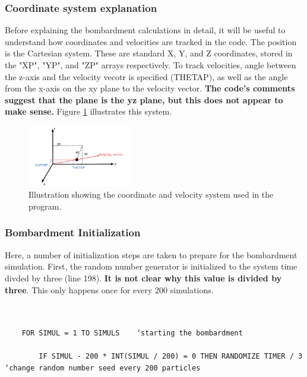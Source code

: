 \documentclass[10pt, reqno]{exam}
\begin{document}
\subsubsection{Coordinate system explanation}

Before explaining the bombardment calculations in detail, it will be useful to understand how coordinates and velocities are tracked in the code. The position is the Cartesian system. These are standard X, Y, and Z coordinates, stored in the "XP", "YP", and "ZP" arrays respectively. To track velocities, angle between the z-axis and the velocity vecotr is specified (THETAP), as well as the angle from the x-axis on the xy plane to the velocity vector. \textbf{The code's comments suggest that the plane is the yz plane, but this does not appear to make sense.} Figure \ref{fig:coordinate system} illustrates this system.

\begin{figure}[h]
    \centering
    \includegraphics[width = 0.4\textwidth]{figures/coordinate_system_explanation.png}
    \caption{Illustration showing the coordinate and velocity system used in the program.}
    \label{fig:coordinate system}
\end{figure}

\clearpage

\subsubsection{Bombardment Initialization}
\label{sec:bombardment initialization}

Here, a number of initialization steps are taken to prepare for the bombardment simulation. First, the random number generator is initialized to the system time divded by three (line 198). \textbf{It is not clear why this value is divided by three}. This only happens once for every 200 simulations. \par

\begin{verbatim}


    FOR SIMUL = 1 TO SIMULS    ‘starting the bombardment 
    
        IF SIMUL - 200 * INT(SIMUL / 200) = 0 THEN RANDOMIZE TIMER / 3  ‘change random number seed every 200 particles
\end{verbatim}
\end{document}
